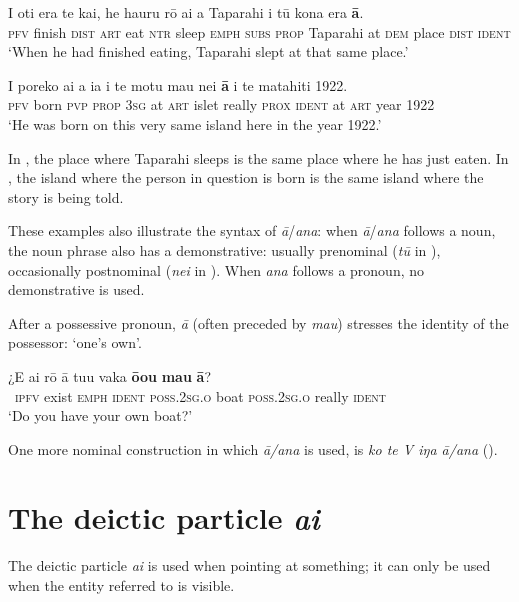 \ea\label{ex:5.157}
\gll I oti era te kai, he ha{\ꞌ}uru rō {\ꞌ}ai a Taparahi {\ꞌ}i tū kona era \textbf{{\ꞌ}ā}. \\
\textsc{pfv} finish \textsc{dist} \textsc{art} eat \textsc{ntr} sleep \textsc{emph} \textsc{subs} \textsc{prop} Taparahi at \textsc{dem} place \textsc{dist} \textsc{ident} \\

\glt 
‘When he had finished eating, Taparahi slept at that same place.’ \textstyleExampleref{[R250.032]} 
\z

\ea\label{ex:5.158}
\gll I poreko ai a ia {\ꞌ}i te motu mau nei \textbf{{\ꞌ}ā} {\ꞌ}i te matahiti 1922. \\
\textsc{pfv} born \textsc{pvp} \textsc{prop} \textsc{3sg} at \textsc{art} islet really \textsc{prox} \textsc{ident} at \textsc{art} year 1922 \\

\glt
‘He was born on this very same island here in the year 1922.’ \textstyleExampleref{[R487.041]} 
\z

In , the place where Taparahi sleeps is the same place where he has just eaten. In , the island where the person in question is born is the same island where the story is being told. 

These examples also illustrate the syntax of \textit{{\ꞌ}ā}/\textit{{\ꞌ}ana}: when \textit{{\ꞌ}ā}/\textit{{\ꞌ}ana} follows a noun, the noun phrase also has a demonstrative: usually prenominal (\textit{tū} in ), occasionally postnominal (\textit{nei} in ). When \textit{{\ꞌ}ana} follows a pronoun, no demonstrative is used. 

After a possessive pronoun, \textit{{\ꞌ}ā} (often preceded by \textit{mau}) stresses the identity of the possessor: ‘one’s own’.

\ea\label{ex:5.159}
\gll ¿E ai rō {\ꞌ}ā tu{\ꞌ}u vaka \textbf{ō{\ꞌ}ou} \textbf{mau} \textbf{{\ꞌ}ā}? \\
~\textsc{ipfv} exist \textsc{emph} \textsc{ident} \textsc{poss.2sg.o} boat \textsc{poss.2sg.o} really \textsc{ident} \\

\glt 
‘Do you have your own boat?’ \textstyleExampleref{[Notes]}
\z

One more nominal construction in which \textit{{\ꞌ}ā/{\ꞌ}ana} is used, is \textit{ko te V iŋa {\ꞌ}ā/{\ꞌ}ana} (). 

\section{The deictic particle \textit{ai}}\label{sec:5.10}
The deictic particle \textit{ai} is used when pointing at something; it can only be used when the entity referred to is visible.

